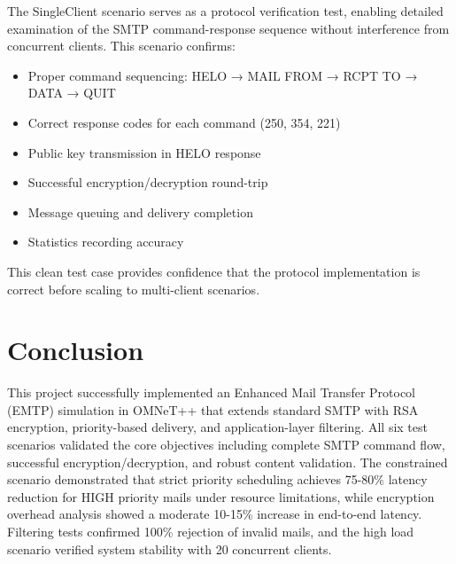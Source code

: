 \documentclass[12pt]{article}
\begin{document}
	The SingleClient scenario serves as a protocol verification test, enabling detailed examination of the SMTP command-response sequence without interference from concurrent clients. This scenario confirms:
	
	\begin{itemize}
		\item Proper command sequencing: HELO → MAIL FROM → RCPT TO → DATA → QUIT
		\item Correct response codes for each command (250, 354, 221)
		\item Public key transmission in HELO response
		\item Successful encryption/decryption round-trip
		\item Message queuing and delivery completion
		\item Statistics recording accuracy
	\end{itemize}
	
	This clean test case provides confidence that the protocol implementation is correct before scaling to multi-client scenarios.
	
	\section{Conclusion}
	
	This project successfully implemented an Enhanced Mail Transfer Protocol (EMTP) simulation in OMNeT++ that extends standard SMTP with RSA encryption, priority-based delivery, and application-layer filtering. All six test scenarios validated the core objectives including complete SMTP command flow, successful encryption/decryption, and robust content validation. The constrained scenario demonstrated that strict priority scheduling achieves 75-80\% latency reduction for HIGH priority mails under resource limitations, while encryption overhead analysis showed a moderate 10-15\% increase in end-to-end latency. Filtering tests confirmed 100\% rejection of invalid mails, and the high load scenario verified system stability with 20 concurrent clients.
	
\end{document}
